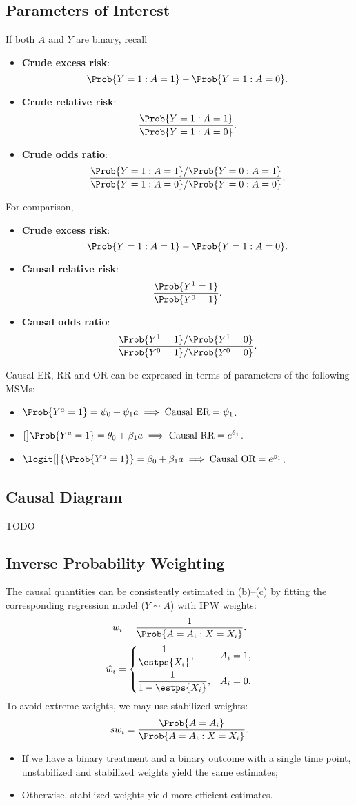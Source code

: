 \documentclass[oneside]{book}\usepackage[]{graphicx}\usepackage[svgnames]{xcolor}
\providecommand\given{} %
\renewcommand\given{\nonscript\:\delimsize\vert\nonscript\:\mathopen{}}%
\renewcommand\given{\nonscript\:\delimsize\vert\nonscript\:\mathopen{}}%
\renewcommand\given{\nonscript\:\delimsize\vert\nonscript\:\mathopen{}}%
\renewcommand\given{\nonscript\:\delimsize\vert\nonscript\:\mathopen{}}%
\renewcommand\given{\nonscript\:\delimsize\vert\nonscript\:\mathopen{}}%
\renewcommand\given{\nonscript\:\delimsize\vert\nonscript\:\mathopen{}}%
\renewcommand\given{\nonscript\:\delimsize\vert\nonscript\:\mathopen{}}%
\renewcommand\given{\nonscript\:\delimsize\vert\nonscript\:\mathopen{}}%
\renewcommand\given{\nonscript\:\delimsize\vert\nonscript\:\mathopen{}}%
\renewcommand\given{\nonscript\:\delimsize\vert\nonscript\:\mathopen{}}%
\renewcommand\given{\nonscript\:\delimsize\vert\nonscript\:\mathopen{}}%
\renewcommand\given{\nonscript\:\delimsize\vert\nonscript\:\mathopen{}}%
\renewcommand\given{\nonscript\:\delimsize\vert\nonscript\:\mathopen{}}%
\renewcommand\given{\nonscript\:\delimsize\vert\nonscript\:\mathopen{}}%
\let\log\relax%
\renewcommand\given{:}
\begin{document}
\subsection*{Parameters of Interest}
If both $A$ and $Y$ are binary, recall
\begin{itemize}
      \item \textbf{Crude excess risk}:
            \[ \Prob{Y=1\given A=1}-\Prob{Y=1\given A=0}. \]
      \item \textbf{Crude relative risk}:
            \[ \frac{\Prob{Y=1\given A=1}}{\Prob{Y=1\given A=0}}. \]
      \item \textbf{Crude odds ratio}:
            \[ \frac{\Prob{Y=1\given A=1}/\Prob{Y=0\given A=1}}{\Prob{Y=1\given A=0}/\Prob{Y=0\given A=0}}. \]
\end{itemize}
For comparison,
\begin{itemize}
      \item \textbf{Crude excess risk}:
            \[ \Prob{Y=1\given A=1}-\Prob{Y=1\given A=0}. \]
      \item \textbf{Causal relative risk}:
            \[ \frac{\Prob{Y^1=1}}{\Prob{Y^0=1}}. \]
      \item \textbf{Causal odds ratio}:
            \[ \frac{\Prob{Y^1=1}/\Prob{Y^1=0}}{\Prob{Y^0=1}/\Prob{Y^0=0}}. \]
\end{itemize}
Causal ER, RR and OR can be expressed in terms of parameters of
the following MSMs:
\begin{itemize}
      \item $ \Prob{Y^a=1}=\psi_0+\psi_1 a\implies\text{Causal ER}=\psi_1 $.
      \item $ \log[\big]{\Prob{Y^a=1}}=\theta_0+\beta_1a\implies\text{Causal RR}=e^{\theta_1} $.
      \item $ \logit[\big]{\Prob{Y^a=1}}=\beta_0+\beta_1a\implies\text{Causal OR}=e^{\beta_1} $.
\end{itemize}
\subsection*{Causal Diagram}
TODO
\subsection*{Inverse Probability Weighting}
The causal quantities can be consistently estimated in (b)--(c) by
fitting the corresponding regression model ($Y \sim A$) with IPW
weights:
\[ w_i=\frac{1}{\Prob{A=A_i\given X=X_i}}. \]
\[ \hat{w}_i=\begin{dcases}
            \frac{1}{\estps{X_i}},   & A_i=1, \\
            \frac{1}{1-\estps{X_i}}, & A_i=0.
      \end{dcases} \]
To avoid extreme weights, we may use stabilized weights:
\[ sw_i=\frac{\Prob{A=A_i}}{\Prob{A=A_i\given X=X_i}}. \]
\begin{itemize}
      \item If we have a binary treatment and a binary outcome with a
            single time point, unstabilized and stabilized weights yield the
            same estimates;
      \item Otherwise, stabilized weights yield more efficient estimates.
\end{itemize}
\end{document}
